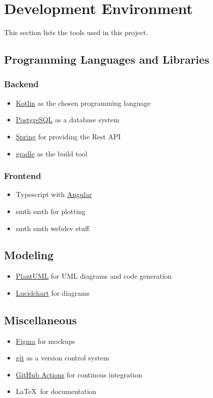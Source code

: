 \section{Development Environment}

This section lists the tools used in this project.

\subsection{Programming Languages and Libraries}

\newcommand\footurl[1]{\footnote{\url{#1}}}

\subsubsection*{Backend}
\begin{itemize}
    \item \href{https://kotlinlang.org/}{Kotlin} as the chosen programming language
    \item \href{https://www.postgresql.org/}{PostgreSQL} as a database system
    \item \href{https://spring.io/}{Spring} for providing the Rest API
    \item \href{https://gradle.org/}{gradle} as the build tool
\end{itemize}

\subsubsection*{Frontend}
\begin{itemize}
    \item Typescript with \href{https://angular.io/}{Angular}
    \item smth smth for plotting
    \item smth smth webdev stuff
\end{itemize}

\subsection{Modeling}
\begin{itemize}
    \item \href{https://plantuml.com/}{PlantUML} for UML diagrams and code generation
    \item \href{https://www.lucidchart.com/}{Lucidchart} for diagrams
\end{itemize}

\subsection{Miscellaneous}
\begin{itemize}
    \item \href{https://www.figma.com/}{Figma} for mockups
    \item \href{https://git-scm.com/}{git} as a version control system
    \item \href{https://github.com/features/actions}{GitHub Actions} for continous integration
    \item \LaTeX \ for documentation
\end{itemize}
